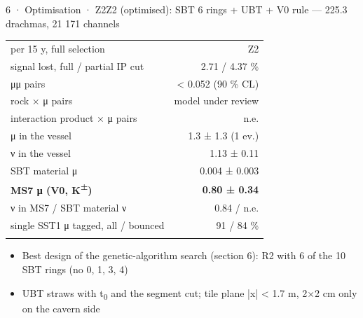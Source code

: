 \begin{btframe}{6 · Optimisation · Z2}{Z2 (optimised): SBT 6 rings + UBT + V0 rule — 225.3 drachmas, 21 171 channels}
{\par}
\vspace{2.46pt}
\noindent \begin{minipage}[c]{0.5\linewidth}
{\fontsize{5.31pt}{6.90pt}\selectfont\setlength{\tabcolsep}{3.72pt}\renewcommand{\arraystretch}{1.42}
\begin{tabular}{lr}
\textcolor{muted}{per 15 y, full selection} & \textcolor{muted}{Z2} \\\headrule
signal lost, full / partial IP cut & 2.71 / 4.37 \% \\\rowrule
μμ pairs & < 0.052 (90 \% CL) \\\rowrule
rock × μ pairs & \textcolor{muted}{model under review} \\\rowrule
interaction product × μ pairs & \textcolor{muted}{n.e.} \\\rowrule
μ in the vessel & 1.3 ± 1.3 (1 ev.) \\\rowrule
ν in the vessel & 1.13 ± 0.11 \\\rowrule
SBT material μ & 0.004 ± 0.003 \\\rowrule
\rowcolor{tint}\bfseries MS7 μ (V0, K\textsuperscript{±}) & \bfseries 0.80 ± 0.34 \\\rowrule
ν in MS7 / SBT material ν & 0.84 / \textcolor{muted}{n.e.} \\\rowrule
single SST1 μ tagged, all / bounced & 91 / 84 \% \\\rowrule
\end{tabular}\par}
\end{minipage}%
\hfill%
\begin{minipage}[c]{0.5\linewidth}
{\fontsize{6.15pt}{8.60pt}\selectfont
\begin{itemize}
  \item Best design of the genetic-algorithm search (section 6): R2 with 6 of the 10 SBT rings (no 0, 1, 3, 4)
  \item UBT straws with t\textsubscript{0} and the segment cut; tile plane |x| < 1.7 m, 2×2 cm only on the cavern side

\end{itemize}}
\end{minipage}
\end{btframe}
